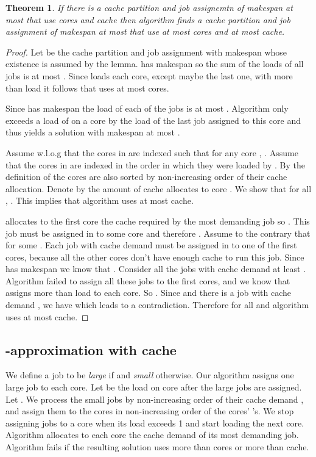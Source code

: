 \documentclass[11pt]{article}
\newtheorem{theorem}{Theorem}[section]
\begin{document}
\begin{theorem}\label{joint2}
If there is a cache partition and job assignemtn of makespan at most  that use  cores and  cache then algorithm  finds a cache partition
and job assignment of makespan at most  that use at most  cores and at most  cache.
\end{theorem}
\begin{proof}
Let  be  the cache partition and job assignment  with
makespan  whose existence is assumed by the lemma.  has makespan  so the sum of the loads of all jobs is at most
. Since  loads each core, except maybe the last one, with more
than  load it follows that  uses at most  cores.

Since  has makespan  the load of each of the jobs is at most
. Algorithm  only exceeds a load of  on a core by the load
of the last job assigned to this core and thus  yields a
solution with makespan at most .

Assume w.l.o.g that the cores in  are
indexed such that for any core , . Assume that
the cores in  are indexed in the order in which they were loaded
by . By the definition of  the cores are also sorted by
non-increasing order of their cache allocation. Denote by  the
amount of cache  allocates to core . We show that for
all , . This implies that
algorithm  uses at most  cache.

 allocates to the first core the cache required by the most
demanding job so . This job must be assigned in
 to some core and therefore . Assume to the
contrary that  for some . Each job  with cache demand  must be assigned in  to one of the first  cores,
because all the other cores don't have enough cache to run this
job. Since  has makespan  we know that . Consider all the jobs with cache demand at
least . Algorithm  failed to assign all these jobs to the first
 cores, and we know that  assigns more than  load to
each core. So . Since
 and there is a job with cache demand , we have  which leads to a contradiction.
Therefore  for all  and  algorithm  uses at
most  cache.
\end{proof}

\subsection{-approximation with  cache}\label{slmc_32}
We define a job to be {\em large} if  and {\em small} otherwise.
Our algorithm  assigns one large job to each core.
 Let
 be the load on core  after the large jobs are assigned. Let
. We process the small jobs by non-increasing order
of their cache demand , and assign them to the cores in
non-increasing order of the cores' 's.
We stop assigning  jobs to a core when its load exceeds 1 and start loading the next core.
Algorithm  allocates to each core the cache demand of its
most demanding job. Algorithm  fails if the resulting solution uses more than  cores or more than  cache.
\end{document}
